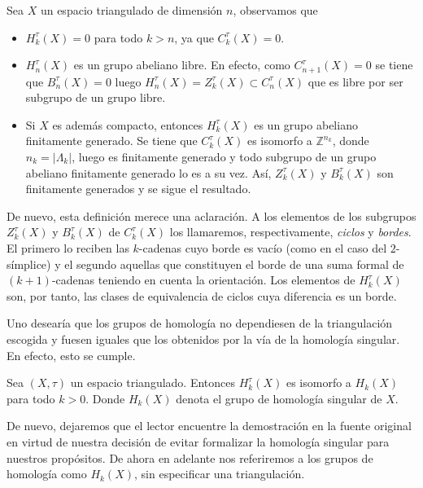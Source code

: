 \begin{remark} Sea $X$ un espacio triangulado de dimensión $n$, observamos que

    \begin{itemize}
        \item $H^{\tau}_k(X)=0$ para todo $k>n$, ya que $C^{\tau}_k(X)=0$.
        \item $H^{\tau}_n(X)$ es un grupo abeliano libre. En efecto, como $C^{\tau}_{n+1}(X)=0$ se tiene que $B^{\tau}_n(X)=0$ luego $H^{\tau}_n(X)=Z^{\tau}_k(X)\subset C^{\tau}_n(X)$ que es libre por ser subgrupo de un grupo libre.
        \item Si $X$ es además compacto, entonces $H^{\tau}_k(X)$ es un grupo abeliano finitamente generado. Se tiene que $C^{\tau}_k(X)$ es isomorfo a $\mathbb{Z}^{n_k}$, donde $n_k=|\Lambda_k|$, luego es finitamente generado y todo subgrupo de un grupo abeliano finitamente generado lo es a su vez. Así, $Z^{\tau}_k(X)$ y $B^{\tau}_k(X)$ son finitamente generados y se sigue el resultado.
    \end{itemize}
\end{remark}

De nuevo, esta definición merece una aclaración. A los elementos de los subgrupos $Z^{\tau}_k(X)$ y $B^{\tau}_k(X)$ de $C^{\tau}_k(X)$ los llamaremos, respectivamente, \textit{ciclos} y \textit{bordes}. El primero lo reciben las $k$-cadenas cuyo borde es vacío (como en el caso del $2$-símplice) y el segundo aquellas que constituyen el borde de una suma formal de $(k+1)$-cadenas teniendo en cuenta la orientación. Los elementos de $H^{\tau}_k(X)$ son, por tanto, las clases de equivalencia de ciclos cuya diferencia es un borde.

Uno desearía que los grupos de homología no dependiesen de la triangulación escogida y fuesen iguales que los obtenidos por la vía de la homología singular. En efecto, esto se cumple. 

\begin{theorem}
    Sea $(X,\tau)$ un espacio triangulado. Entonces $H^{\tau}_k(X)$ es isomorfo a $H_k(X)$ para todo $k>0$. Donde $H_k(X)$ denota el grupo de homología singular de $X$.
\end{theorem}

De nuevo, dejaremos que el lector encuentre la demostración en la fuente original en virtud de nuestra decisión de evitar formalizar la homología singular para nuestros propósitos. De ahora en adelante nos referiremos a los grupos de homología como $H_k(X)$, sin especificar una triangulación.

